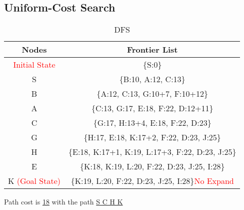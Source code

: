 \documentclass{article}
\begin{document}
	\subsection{Uniform-Cost Search}
	\begin{table}[H]
		\centering
		\caption{DFS}
		\label{tab:table1}
		\begin{tabular}{|c|c|}
			\toprule
			Nodes & Frontier List\\
			\midrule
    		\textcolor{red}{Initial State}  & \{S:0\}\\
    		\hline
    		S  & \{B:10, A:12, C:13\}\\
    		\hline
    		B  & \{A:12, C:13,  G:10+7, F:10+12\}\\
    		\hline
    		A  & \{C:13,  G:17, E:18, F:22, D:12+11\}\\
    		\hline
    		C  & \{G:17, H:13+4, E:18, F:22, D:23\}\\
            \hline
            G  & \{H:17, E:18, K:17+2, F:22, D:23, J:25\}\\
            \hline
            H  & \{E:18, K:17+1, K:19, L:17+3, F:22, D:23, J:25\}\\
            \hline
            E  & \{K:18, K:19, L:20, F:22, D:23, J:25, I:28\}\\
            \hline
            K \textcolor{red}{(Goal State)} & \{K:19, L:20, F:22, D:23, J:25, I:28\}\textcolor{red}{No Expand}\\
            \hline
		\end{tabular}
	\end{table}
    \vspace{-.5pc}
        Path cost is \underline{18} with the path \underline{S C H K}
\end{document}
